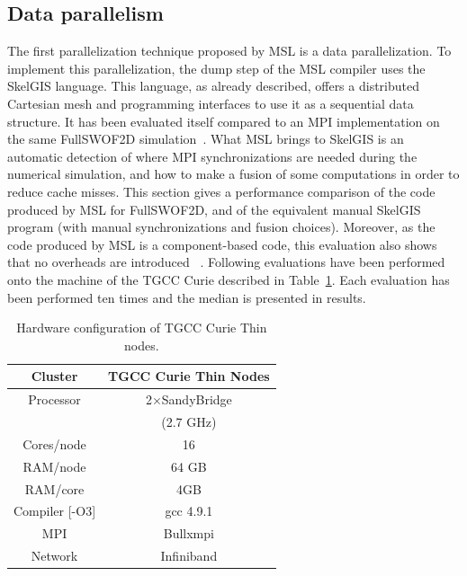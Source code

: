 \subsection{Data parallelism}

The first parallelization technique proposed by MSL is a data parallelization. To implement this parallelization, the dump step of the MSL compiler uses the SkelGIS language. This language, as already described, offers a distributed Cartesian mesh and programming interfaces to use it as a sequential data structure. It has been evaluated itself compared to an MPI implementation on the same FullSWOF2D simulation~\cite{CPE:CPE3494}. What MSL brings to SkelGIS is an automatic detection of where MPI synchronizations are needed during the numerical simulation, and how to make a fusion of some computations in order to reduce cache misses. This section gives a performance comparison of the code produced by MSL for FullSWOF2D, and of the equivalent manual SkelGIS program (with manual synchronizations and fusion choices). Moreover, as the code produced by MSL is a component-based code, this evaluation also shows that no overheads are introduced \llc~\cite{l2c}. Following evaluations have been performed onto the machine of the TGCC Curie described in Table~\ref{tab:TGCC}. Each evaluation has been performed ten times and the median is presented in results.

\begin{table}[!h]
\begin{center}
 \begin{tabular}{|c|c|}
   \hline
    Cluster & \textbf{TGCC Curie Thin Nodes}\\
     \hline         
    Processor & 2$\times$SandyBridge\\
    & (2.7 GHz)\\
    Cores/node & 16 \\
    RAM/node & 64 GB\\
    RAM/core & 4GB\\
    Compiler [-O3] & gcc 4.9.1\\
    MPI & Bullxmpi\\
    Network & Infiniband\\
    \hline
 \end{tabular}
 \caption{\label{tab:TGCC}Hardware configuration of TGCC Curie Thin nodes.}
 \end{center}
\end{table}

